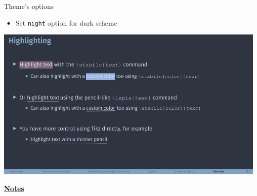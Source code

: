 \documentclass[10pt]{beamer}
\begin{document}
\begin{frame}
    {Theme's options}
    \begin{itemize}
        \item Set \texttt{night} option for dark scheme 
    \end{itemize}
    \begin{center}
        \begin{minipage}[b]{.6\textwidth}
            \includegraphics[width=\textwidth]{night}
        \end{minipage}
    \end{center}
\end{frame}
\begin{flushleft}
    \underline{\textbf{Notes}}\setlength{\parskip}{.15cm}\notesize\newline\par
\end{flushleft}
\end{document}
